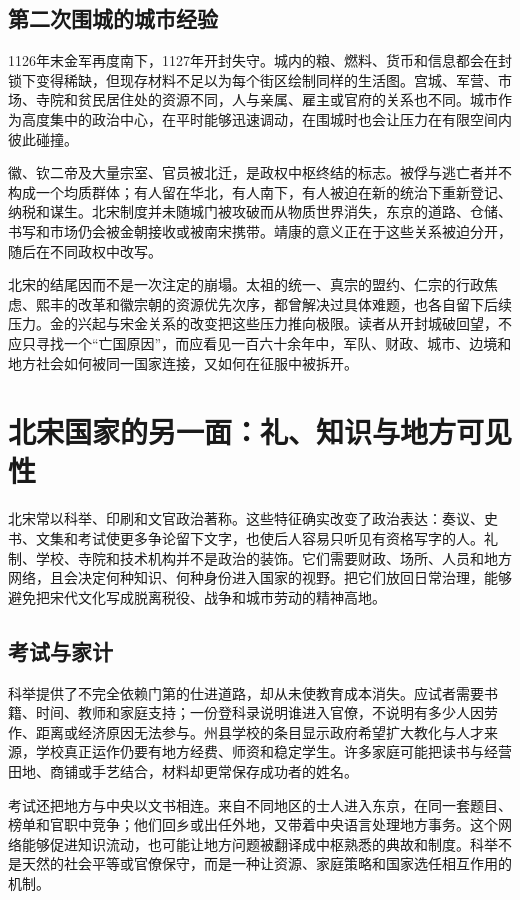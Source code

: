 \subsection{第二次围城的城市经验}

1126年末金军再度南下，1127年开封失守。城内的粮、燃料、货币和信息都会在封锁下变得稀缺，但现存材料不足以为每个街区绘制同样的生活图。宫城、军营、市场、寺院和贫民居住处的资源不同，人与亲属、雇主或官府的关系也不同。城市作为高度集中的政治中心，在平时能够迅速调动，在围城时也会让压力在有限空间内彼此碰撞。

徽、钦二帝及大量宗室、官员被北迁，是政权中枢终结的标志。被俘与逃亡者并不构成一个均质群体；有人留在华北，有人南下，有人被迫在新的统治下重新登记、纳税和谋生。北宋制度并未随城门被攻破而从物质世界消失，东京的道路、仓储、书写和市场仍会被金朝接收或被南宋携带。靖康的意义正在于这些关系被迫分开，随后在不同政权中改写。

北宋的结尾因而不是一次注定的崩塌。太祖的统一、真宗的盟约、仁宗的行政焦虑、熙丰的改革和徽宗朝的资源优先次序，都曾解决过具体难题，也各自留下后续压力。金的兴起与宋金关系的改变把这些压力推向极限。读者从开封城破回望，不应只寻找一个“亡国原因”，而应看见一百六十余年中，军队、财政、城市、边境和地方社会如何被同一国家连接，又如何在征服中被拆开。

\section{北宋国家的另一面：礼、知识与地方可见性}

北宋常以科举、印刷和文官政治著称。这些特征确实改变了政治表达：奏议、史书、文集和考试使更多争论留下文字，也使后人容易只听见有资格写字的人。礼制、学校、寺院和技术机构并不是政治的装饰。它们需要财政、场所、人员和地方网络，且会决定何种知识、何种身份进入国家的视野。把它们放回日常治理，能够避免把宋代文化写成脱离税役、战争和城市劳动的精神高地。

\subsection{考试与家计}

科举提供了不完全依赖门第的仕进道路，却从未使教育成本消失。应试者需要书籍、时间、教师和家庭支持；一份登科录说明谁进入官僚，不说明有多少人因劳作、距离或经济原因无法参与。州县学校的条目显示政府希望扩大教化与人才来源，学校真正运作仍要有地方经费、师资和稳定学生。许多家庭可能把读书与经营田地、商铺或手艺结合，材料却更常保存成功者的姓名。

考试还把地方与中央以文书相连。来自不同地区的士人进入东京，在同一套题目、榜单和官职中竞争；他们回乡或出任外地，又带着中央语言处理地方事务。这个网络能够促进知识流动，也可能让地方问题被翻译成中枢熟悉的典故和制度。科举不是天然的社会平等或官僚保守，而是一种让资源、家庭策略和国家选任相互作用的机制。

